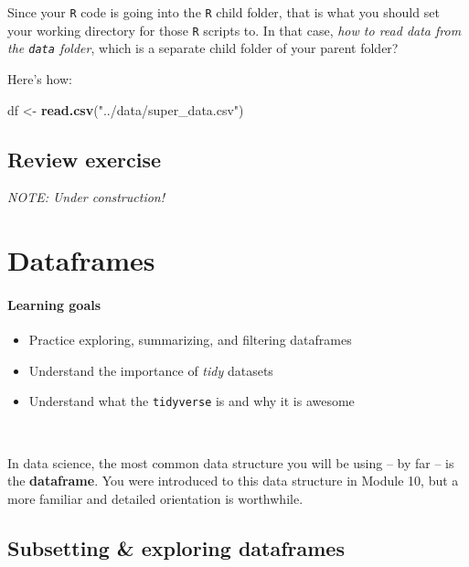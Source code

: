 \documentclass[
]{book}
\newenvironment{Shaded}{\begin{snugshade}}{\end{snugshade}}
\newcommand{\KeywordTok}[1]{\textcolor[rgb]{0.13,0.29,0.53}{\textbf{#1}}}
\newcommand{\NormalTok}[1]{#1}
\newcommand{\StringTok}[1]{\textcolor[rgb]{0.31,0.60,0.02}{#1}}
\providecommand{\tightlist}{%
  \setlength{\itemsep}{0pt}\setlength{\parskip}{0pt}}
\begin{document}
Since your \texttt{R} code is going into the \texttt{R} child folder, that is what you should set your working directory for those \texttt{R} scripts to. In that case, \emph{how to read data from the \texttt{data} folder}, which is a separate child folder of your parent folder?

Here's how:

\begin{Shaded}
\begin{Highlighting}[]
\NormalTok{df <-}\StringTok{ }\KeywordTok{read.csv}\NormalTok{(}\StringTok{"../data/super_data.csv"}\NormalTok{)}
\end{Highlighting}
\end{Shaded}

\hypertarget{review-exercise}{%
\section*{Review exercise}\label{review-exercise}}

\emph{NOTE: Under construction!}

\hypertarget{dataframes}{%
\chapter{Dataframes}\label{dataframes}}

\hypertarget{learning-goals-9}{%
\subsubsection*{Learning goals}\label{learning-goals-9}}

\begin{itemize}
\tightlist
\item
  Practice exploring, summarizing, and filtering dataframes
\item
  Understand the importance of \emph{tidy} datasets
\item
  Understand what the \texttt{tidyverse} is and why it is awesome
\end{itemize}

~

In data science, the most common data structure you will be using -- by far -- is the \textbf{dataframe}. You were introduced to this data structure in Module 10, but a more familiar and detailed orientation is worthwhile.

\hypertarget{subsetting-exploring-dataframes}{%
\section*{Subsetting \& exploring dataframes}\label{subsetting-exploring-dataframes}}
\end{document}
